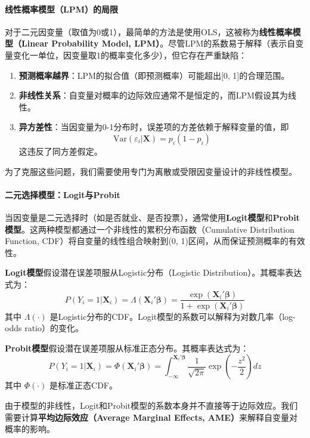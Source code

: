 \paragraph*{线性概率模型（LPM）的局限}
对于二元因变量（取值为0或1），最简单的方法是使用OLS，这被称为\textbf{线性概率模型（Linear Probability Model, LPM）}。尽管LPM的系数易于解释（表示自变量变化一单位，因变量取1的概率变化多少），但它存在严重缺陷：
\begin{enumerate}
    \item \textbf{预测概率越界}：LPM的拟合值（即预测概率）可能超出[0, 1]的合理范围。
    \item \textbf{非线性关系}：自变量对概率的边际效应通常不是恒定的，而LPM假设其为线性。
    \item \textbf{异方差性}：当因变量为0-1分布时，误差项的方差依赖于解释变量的值，即
    \[
    \text{Var}(\varepsilon_i | \mathbf{X}) = p_i(1-p_i)
    \]
    这违反了同方差假定。
\end{enumerate}

为了克服这些问题，我们需要使用专门为离散或受限因变量设计的非线性模型。

\paragraph*{二元选择模型：Logit与Probit}
当因变量是二元选择时（如是否就业、是否投票），通常使用\textbf{Logit模型}和\textbf{Probit模型}。这两种模型都通过一个非线性的累积分布函数（Cumulative Distribution Function, CDF）将自变量的线性组合映射到(0, 1)区间，从而保证预测概率的有效性。

\textbf{Logit模型}假设潜在误差项服从Logistic分布（Logistic Distribution）。其概率表达式为：
\begin{equation}
P(Y_i=1 | \mathbf{X}_i) = \Lambda(\mathbf{X}_i'\boldsymbol{\beta}) = \frac{\exp(\mathbf{X}_i'\boldsymbol{\beta})}{1 + \exp(\mathbf{X}_i'\boldsymbol{\beta})}
\end{equation}
其中 $\Lambda(\cdot)$ 是Logistic分布的CDF。Logit模型的系数可以解释为对数几率（log-odds ratio）的变化。

\textbf{Probit模型}假设潜在误差项服从标准正态分布。其概率表达式为：
\begin{equation}
P(Y_i=1 | \mathbf{X}_i) = \Phi(\mathbf{X}_i'\boldsymbol{\beta}) = \int_{-\infty}^{\mathbf{X}_i'\boldsymbol{\beta}} \frac{1}{\sqrt{2\pi}} \exp\left(-\frac{z^2}{2}\right) dz
\end{equation}
其中 $\Phi(\cdot)$ 是标准正态CDF。

由于模型的非线性，Logit和Probit模型的系数本身并不直接等于边际效应。我们需要计算\textbf{平均边际效应（Average Marginal Effects, AME）}来解释自变量对概率的影响。


